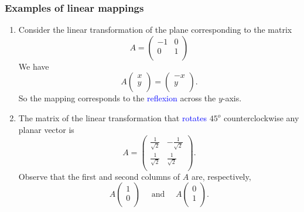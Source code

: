 \documentclass[11pt,aspectratio=169]{beamer}
\begin{document}
\begin{frame}
\frametitle{Examples of linear mappings}
\begin{small}
\begin{enumerate}
\item Consider the linear transformation of the plane corresponding to the matrix
\begin{equation*} 
 A=\begin{pmatrix}
-1 & 0\\
0 & 1 \\
\end{pmatrix}
\end{equation*}
We have
\begin{equation*}
A\begin{pmatrix}x\\
y \\
\end{pmatrix}=\begin{pmatrix}-x\\
y \\
\end{pmatrix}.
\end{equation*}
So the mapping corresponds to the \textcolor{blue}{reflexion} across the $y$-axis.

\item The matrix of the linear transformation that \textcolor{blue}{rotates} $45^{o}$ counterclockwise any planar vector is
\begin{equation*} 
 A=\begin{pmatrix}
\frac{1}{\sqrt{2}} & -\frac{1}{\sqrt{2}}\\
\frac{1}{\sqrt{2}} & \frac{1}{\sqrt{2}} \\
\end{pmatrix}.
\end{equation*}
Observe that the first and second columns of $A$ are, respectively,
\begin{equation*}
A\begin{pmatrix}1\\
0 \\
\end{pmatrix} \quad \text{ and } \quad A\begin{pmatrix}0\\
1 \\
\end{pmatrix}.
\end{equation*}
\end{enumerate}

\end{small}
\end{frame}
\end{document}
